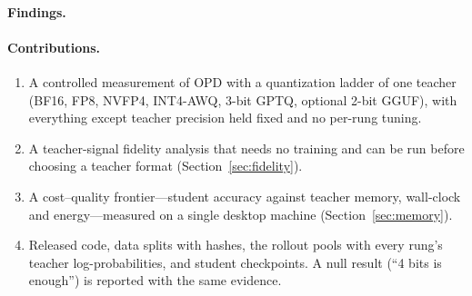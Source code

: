 \paragraph{Findings.} \TBD{} 

\paragraph{Contributions.}
\begin{enumerate}
  \item A controlled measurement of OPD with a quantization ladder of one teacher
        (BF16, FP8, NVFP4, INT4-AWQ, 3-bit GPTQ, optional 2-bit GGUF), with everything except
        teacher precision held fixed and no per-rung tuning.
  \item A teacher-signal fidelity analysis that needs no training and can be run before
        choosing a teacher format (Section~\ref{sec:fidelity}).
  \item A cost--quality frontier---student accuracy against teacher memory, wall-clock and
        energy---measured on a single desktop machine (Section~\ref{sec:memory}).
  \item Released code, data splits with hashes, the rollout pools with every rung's teacher
        log-probabilities, and student checkpoints. A null result (``4 bits is enough'') is
        reported with the same evidence.
\end{enumerate}
